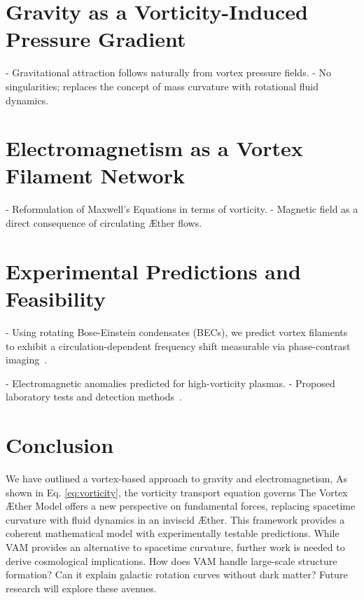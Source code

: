 \documentclass[a4paper,10pt]{article}
\begin{document}
    \section{Gravity as a Vorticity-Induced Pressure Gradient}\label{sec:gravity-as-a-vorticity-induced-pressure-gradient}
    - Gravitational attraction follows naturally from vortex pressure fields.
    - No singularities; replaces the concept of mass curvature with rotational fluid dynamics.

    \section{Electromagnetism as a Vortex Filament Network}\label{sec:electromagnetism-as-a-vortex-filament-network}
    - Reformulation of Maxwell\rq s Equations in terms of vorticity.
    - Magnetic field as a direct consequence of circulating \AE ther flows.

    \section{Experimental Predictions and Feasibility}\label{sec:experimental-predictions-and-feasibility}
    - Using rotating Bose-Einstein condensates (BECs), we predict vortex filaments to exhibit a circulation-dependent frequency shift measurable via phase-contrast imaging~\cite{kleckner2013}.

    - Electromagnetic anomalies predicted for high-vorticity plasmas.
    - Proposed laboratory tests and detection methods~\cite{kleckner2013, vinen2024, podkletnov2007, orlandi2021}.

    \section{Conclusion}\label{sec:conclusion}
    We have outlined a vortex-based approach to gravity and electromagnetism, As shown in Eq. \eqref{eq:vorticity}, the vorticity transport equation governs  The Vortex \AE ther Model offers a new perspective on fundamental forces,
    replacing spacetime curvature with fluid dynamics in an inviscid \AE ther.
    This framework provides a coherent mathematical model with experimentally testable predictions.
    While VAM provides an alternative to spacetime curvature, further work is needed to derive cosmological implications.
    How does VAM handle large-scale structure formation?
    Can it explain galactic rotation curves without dark matter?
    Future research will explore these avenues.
\end{document}
